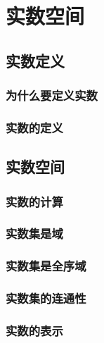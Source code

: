 

\chapter{实数空间}\label{ch:9}
\section{实数定义}
\subsection{为什么要定义实数}
\subsection{实数的定义}

\section{实数空间}
\subsection{实数的计算}
\subsection{实数集是域}
\subsection{实数集是全序域}
\subsection{实数集的连通性}
\subsection{实数的表示}
